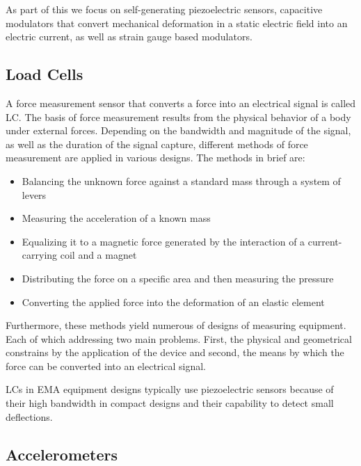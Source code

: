 As part of this we focus on self-generating piezoelectric sensors, capacitive modulators that convert mechanical deformation in a static electric field into an electric current, as well as strain gauge based modulators.

\subsection{Load Cells}

A force measurement sensor that converts a force into an electrical signal is called \acf{LC}. The basis of force measurement results from the physical behavior of a body under external forces. Depending on the bandwidth and magnitude of the signal, as well as the duration of the signal capture, different methods of force measurement are applied in various designs. The methods in brief are:

\begin{itemize}
  \item Balancing the unknown force against a standard mass through a system of levers
  \item Measuring the acceleration of a known mass
  \item Equalizing it to a magnetic force generated by the interaction of a current-carrying coil and a magnet
  \item Distributing the force on a specific area and then measuring the pressure
  \item Converting the applied force into the deformation of an elastic element
\end{itemize}

Furthermore, these methods yield numerous of designs of measuring equipment. Each of which addressing two main problems. First, the physical and geometrical constrains by the application of the device and second, the means by which the force can be converted into an electrical signal.

\ac{LC}s in \ac{EMA} equipment designs typically use piezoelectric sensors because of their high bandwidth in compact designs and their capability to detect small deflections.

\subsection{Accelerometers}

